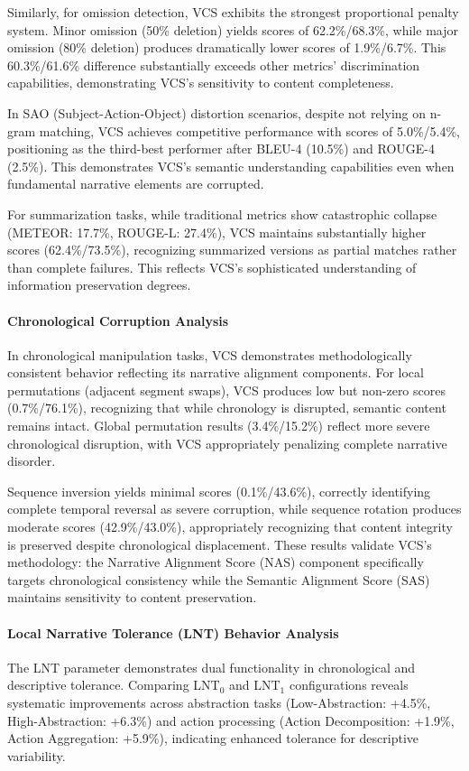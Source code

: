 \documentclass[main.tex]{subfiles}
\begin{document}
Similarly, for omission detection, VCS exhibits the strongest proportional penalty system. Minor omission (50\% deletion) yields scores of 62.2\%/68.3\%, while major omission (80\% deletion) produces dramatically lower scores of 1.9\%/6.7\%. This 60.3\%/61.6\% difference substantially exceeds other metrics' discrimination capabilities, demonstrating VCS's sensitivity to content completeness.

In SAO (Subject-Action-Object) distortion scenarios, despite not relying on n-gram matching, VCS achieves competitive performance with scores of 5.0\%/5.4\%, positioning as the third-best performer after BLEU-4 (10.5\%) and ROUGE-4 (2.5\%). This demonstrates VCS's semantic understanding capabilities even when fundamental narrative elements are corrupted.

For summarization tasks, while traditional metrics show catastrophic collapse (METEOR: 17.7\%, ROUGE-L: 27.4\%), VCS maintains substantially higher scores (62.4\%/73.5\%), recognizing summarized versions as partial matches rather than complete failures. This reflects VCS's sophisticated understanding of information preservation degrees.

\paragraph{Chronological Corruption Analysis}
In chronological manipulation tasks, VCS demonstrates methodologically consistent behavior reflecting its narrative alignment components. For local permutations (adjacent segment swaps), VCS produces low but non-zero scores (0.7\%/76.1\%), recognizing that while chronology is disrupted, semantic content remains intact. Global permutation results (3.4\%/15.2\%) reflect more severe chronological disruption, with VCS appropriately penalizing complete narrative disorder.

Sequence inversion yields minimal scores (0.1\%/43.6\%), correctly identifying complete temporal reversal as severe corruption, while sequence rotation produces moderate scores (42.9\%/43.0\%), appropriately recognizing that content integrity is preserved despite chronological displacement. These results validate VCS's methodology: the Narrative Alignment Score (NAS) component specifically targets chronological consistency while the Semantic Alignment Score (SAS) maintains sensitivity to content preservation.

\paragraph{Local Narrative Tolerance (LNT) Behavior Analysis}
The LNT parameter demonstrates dual functionality in chronological and descriptive tolerance. Comparing LNT$_0$ and LNT$_1$ configurations reveals systematic improvements across abstraction tasks (Low-Abstraction: +4.5\%, High-Abstraction: +6.3\%) and action processing (Action Decomposition: +1.9\%, Action Aggregation: +5.9\%), indicating enhanced tolerance for descriptive variability.
\end{document}
